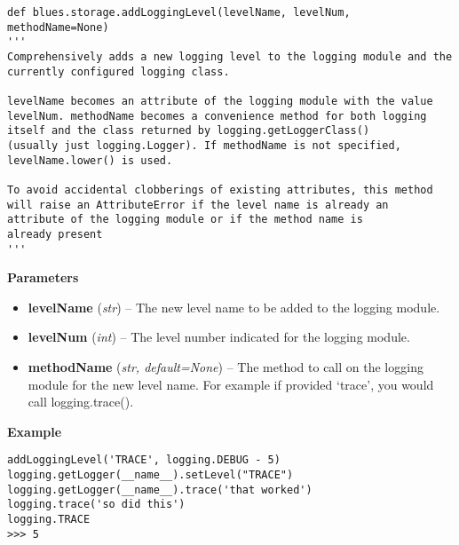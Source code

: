 \begin{description}
\begin{verbatim}
def blues.storage.addLoggingLevel(levelName, levelNum, methodName=None)
'''
Comprehensively adds a new logging level to the logging module and the
currently configured logging class.

levelName becomes an attribute of the logging module with the value
levelNum. methodName becomes a convenience method for both logging
itself and the class returned by logging.getLoggerClass() 
(usually just logging.Logger). If methodName is not specified,
levelName.lower() is used.

To avoid accidental clobberings of existing attributes, this method 
will raise an AttributeError if the level name is already an 
attribute of the logging module or if the method name is 
already present
'''
\end{verbatim}

\begin{description}
\item
    \textbf{Parameters}
\begin{itemize}
\item
  \textbf{levelName} (\emph{str}) -- The new level name to be added to
  the logging module.
\item
  \textbf{levelNum} (\emph{int}) -- The level number indicated for the
  logging module.
\item
  \textbf{methodName} (\emph{str, default=None}) -- The method to call
  on the logging module for the new level name. For example if provided
  `trace', you would call logging.trace().
\end{itemize}
\end{description}

\begin{description}
\item 
    \textbf{Example}

\begin{verbatim}
addLoggingLevel('TRACE', logging.DEBUG - 5)
logging.getLogger(__name__).setLevel("TRACE")
logging.getLogger(__name__).trace('that worked')
logging.trace('so did this')
logging.TRACE
>>> 5
\end{verbatim}
\end{description}
\end{description}

